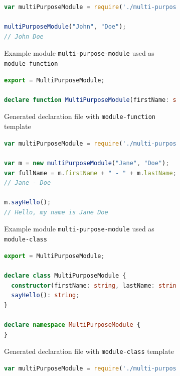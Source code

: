 \documentclass[a4paper,english,cleveref, autoref]{lipics-v2019}
\begin{document}
\begin{figure}[tp]
  \centering
  \begin{subfigure}{0.48\linewidth}
    \begin{lstlisting}[language=JavaScript]
var multiPurposeModule = require('./multi-purpose-module');

multiPurposeModule("John", "Doe");
// John Doe
    \end{lstlisting}
    \caption{Example module \texttt{multi-purpose-module} used as \texttt{module-function}}
  \end{subfigure}
  \hfill
  \begin{subfigure}{0.48\linewidth}
    \begin{lstlisting}[language=TypeScript]
export = MultiPurposeModule;

declare function MultiPurposeModule(firstName: string, lastName: string): string;
    \end{lstlisting}
    \caption{Generated declaration file with \texttt{module-function} template}
  \end{subfigure}

  \begin{subfigure}{0.48\linewidth}
    \begin{lstlisting}[language=JavaScript]
var multiPurposeModule = require('./multi-purpose-module');

var m = new multiPurposeModule("Jane", "Doe");
var fullName = m.firstName + " - " + m.lastName;
// Jane - Doe

m.sayHello();
// Hello, my name is Jane Doe
    \end{lstlisting}
    \caption{Example module \texttt{multi-purpose-module} used as \texttt{module-class}}
    \end{subfigure}
    \hfill
    \begin{subfigure}{0.48\linewidth}
      \begin{lstlisting}[language=TypeScript]
export = MultiPurposeModule;

declare class MultiPurposeModule {
  constructor(firstName: string, lastName: string);
  sayHello(): string;
}

declare namespace MultiPurposeModule {
}
      \end{lstlisting}
      \caption{Generated declaration file with \texttt{module-class} template}
    \end{subfigure}


    \begin{subfigure}{0.48\linewidth}
      \begin{lstlisting}[language=JavaScript]
var multiPurposeModule = require('./multi-purpose-module');


\end{lstlisting}
\end{subfigure}
\end{figure}
\end{document}
